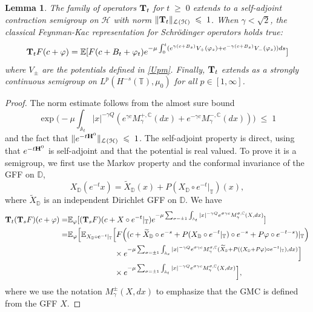 \documentclass[11pt]{amsart}
\numberwithin{equation}{section}
\newtheorem{lemma}[theorem]{Lemma}
\theoremstyle{definition}
\renewcommand{\tilde}{\widetilde}          %
\renewcommand{\leq}{\;\leqslant\;}                   %
\renewcommand{\geq}{\;\geqslant\;}                   %
\newcommand{\C}{\mathbb{C}}
\newcommand{\A}{\mathbb{A}}
\newcommand{\D}{\mathbb{D}}
\def\E{\mathbb{E}}
\newcommand{\mc}{\mathcal}
\def\T{\mathbb{T}}
\begin{document}
\begin{lemma}\label{semigroupT_t}
The family of operators ${\bf T}_t$ for $t\geq 0$ extends to a self-adjoint contraction semigroup on $\mc{H}$ with norm $\|{\bf T}_t\|_{\mc{L}(\mc{H})}\leq 1$. 
When $\gamma<\sqrt{2}$, the classical Feynman-Kac representation for Schr\"odinger operators holds true: 
\begin{equation}\label{TtFeynmannKac}
 {\bf T}_tF(c+\varphi)=\E[ F(c+B_t+\varphi_t)e^{-\mu \int_{0}^t (e^{\gamma(c+B_s)}V_+(\varphi_s)+e^{-\gamma(c+B_s)}V_-(\varphi_s))ds}] \end{equation}
where $V_\pm$ are the potentials defined in \eqref{Upm}. Finally, ${\bf T}_t$ extends as a strongly continuous semigroup on $L^p(H^{-s}(\T),\mu_0)$ for all $p\in [1,\infty]$.
\end{lemma}
\begin{proof}
The norm estimate follows from the almost sure bound
\[ \exp\Big(-\mu  \int_{\A_t}|x|^{-\gamma Q}(e^{\gamma c}M_\gamma^{+,\C}(dx)+e^{-\gamma c}M^{-,\C}_\gamma(dx))\Big)\leq 1\]
and the fact that $\|e^{-t{\bf H}^0}\|_{\mc{L}(\mc{H})}\leq 1$. The self-adjoint property is direct, using that $e^{-t{\bf H}^0}$ is self-adjoint and that the potential is real valued.
To prove it is a semigroup, we first use the Markov property and the conformal invariance of the GFF on $\D$, 
\begin{equation}\label{GFFscaling} 
X_\D(e^{-t}x)=\tilde{X}_{\D}(x)+P(X_\D \circ e^{-t}|_{\T})(x),
\end{equation}
where $\tilde{X}_\D$ is an independent Dirichlet GFF on $\D$. We have 
\[\begin{split}
{\bf T}_t({\bf T}_sF)(c+\varphi)=& \E_\varphi[({\bf T}_sF)(c+X\circ e^{-t}|_{\T})e^{-\mu\sum_{\sigma = \pm 1}\int_{\A_t} |x|^{-\gamma Q}e^{\sigma \gamma c}M_\gamma^{\sigma,\C}(X,dx)}]\\
=&  \E_\varphi\Big[\E_{X_{\D}\circ e^{-t}|_{\T}}\Big[ F\Big((c+\tilde{X}_{\D}\circ e^{-s}+P(X_{\D}\circ e^{-t}|_{\T})\circ e^{-s}+P\varphi\circ e^{-t-s})|_{\T}\Big)\\
& \qquad \qquad\qquad  \times e^{-\mu\sum_{\sigma = \pm 1}\int_{\A_s} |x|^{-\gamma Q}e^{\sigma \gamma c}M_\gamma^{\sigma,\C}(\tilde{X}_\D+P((X_\D+P\varphi)\circ e^{-t}|_{\T}),dx)}\Big]\\
& \qquad \qquad\qquad\times e^{-\mu\sum_{\sigma = \pm 1}\int_{\A_t} |x|^{-\gamma Q}e^{\sigma \gamma c}M_\gamma^{\sigma,\C}(X,dx)}\Big],
\end{split}\]
where we use the notation $M_\gamma^{\pm}(X,dx)$ to emphasize that the GMC is defined from the GFF $X$. 

\end{proof}
\end{document}
